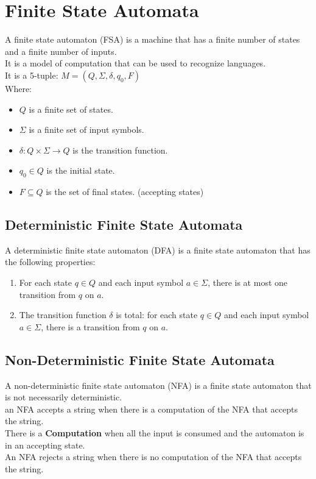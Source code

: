 \section{Finite State Automata}
A finite state automaton (FSA) is a machine that has a finite number of states and a finite number of inputs.\\
It is a model of computation that can be used to recognize languages.\\
It is a 5-tuple: $M = (Q, \Sigma, \delta, q_0, F)$\\
Where:
\begin{itemize}
    \item $Q$ is a finite set of states.
    \item $\Sigma$ is a finite set of input symbols.
    \item $\delta: Q \times \Sigma \rightarrow Q$ is the transition function.
    \item $q_0 \in Q$ is the initial state.
    \item $F \subseteq Q$ is the set of final states. (accepting states)
\end{itemize}

\subsection{Deterministic Finite State Automata}
A deterministic finite state automaton (DFA) is a finite state automaton that has the following properties:
\begin{enumerate}
    \item For each state $q \in Q$ and each input symbol $a \in \Sigma$, there is at most one transition from $q$ on $a$.
    \item The transition function $\delta$ is total: for each state $q \in Q$ and each input symbol $a \in \Sigma$, there is a transition from $q$ on $a$.
\end{enumerate}

\subsection{Non-Deterministic Finite State Automata}
A non-deterministic finite state automaton (NFA) is a finite state automaton that is not necessarily deterministic.\\
an NFA accepts a string when there is a computation of the NFA that accepts the string. \\
There is a \textbf{Computation} when all the input is consumed and the automaton is in an accepting state.\\
An NFA rejects a string when there is no computation of the NFA that accepts the string.\\

